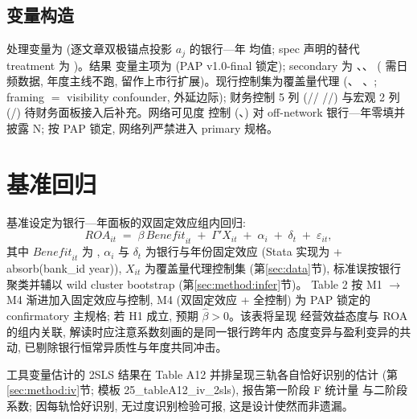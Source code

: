 \subsection{变量构造}
处理变量为  (逐文章双极锚点投影 $a_j$ 的银行—年
均值; spec 声明的替代 treatment 为 )。结果
变量主项为  (PAP v1.0-final 锁定); secondary 为
、、
 ( 需日频数据, 年度主线不跑,
留作上市行扩展)。现行控制集为覆盖量代理 (、
、; framing $=$ visibility confounder,
外延边际); 财务控制 5 列 (//
//) 与宏观 2 列
(/) 待财务面板接入后补充。网络可见度
控制 (、) 对 off-network
银行—年零填并披露 N; 按 PAP 锁定, 网络列严禁进入 primary 规格。

\section{基准回归}\label{sec:main}
基准设定为银行—年面板的双固定效应组内回归:
\begin{equation}\label{eq:baseline}
\mathit{ROA}_{it} \;=\; \beta\,\mathit{Benefit}_{it} \;+\; \Gamma' X_{it}
\;+\; \alpha_i \;+\; \delta_t \;+\; \varepsilon_{it},
\end{equation}
其中 $\mathit{Benefit}_{it}$ 为 , $\alpha_i$ 与
$\delta_t$ 为银行与年份固定效应 (Stata 实现为  +
absorb(bank\_id year)), $X_{it}$ 为覆盖量代理控制集 (第\ref{sec:data}节),
标准误按银行聚类并辅以 wild cluster bootstrap (第\ref{sec:method:infer}节)。
Table 2 按 M1 $\to$ M4 渐进加入固定效应与控制, M4 (双固定效应 + 全控制) 为
PAP 锁定的 confirmatory 主规格; 若 H1 成立, 预期 $\hat\beta > 0$。该表将呈现
经营效益态度与 ROA 的组内关联, 解读时应注意系数刻画的是同一银行跨年内
态度变异与盈利变异的共动, 已剔除银行恒常异质性与年度共同冲击。

工具变量估计的 2SLS 结果在 Table A12 并排呈现三轨各自恰好识别的估计
(第\ref{sec:method:iv}节; 模板 25\_tableA12\_iv\_2sls), 报告第一阶段 F 统计量
与二阶段系数; 因每轨恰好识别, 无过度识别检验可报, 这是设计使然而非遗漏。

